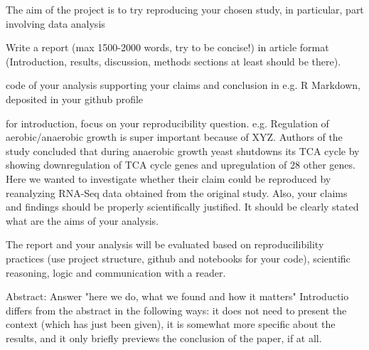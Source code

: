 The aim of the project is to try reproducing your chosen study, in particular, part involving data analysis 

Write a report (max 1500-2000 words, try to be concise!) in article format (Introduction, results, discussion, methods sections at least should be there). 

code of your analysis supporting your claims and conclusion in e.g. R Markdown, deposited in your github profile

for introduction, focus on your reproducibility question. e.g. Regulation of aerobic/anaerobic growth is super important because of XYZ. Authors of the study concluded that during anaerobic growth yeast shutdowns its TCA cycle by showing downregulation of TCA cycle genes and upregulation of 28 other genes. Here we wanted to investigate whether their claim could be reproduced by reanalyzing RNA-Seq data obtained from the original study. Also, your claims and findings should be properly scientifically justified. It should be clearly stated what are the aims of your analysis.

The report and your analysis will be evaluated based on reproducilibility practices (use project structure, github and notebooks for your code), scientific reasoning, logic and communication with a reader.

Abstract: Answer "here we do, what we found and how it matters"
Introductio differs from the abstract in the following ways: it does not need to present the context (which has just been given), it is somewhat more specific about the results, and it only briefly previews the conclusion of the paper, if at all.
